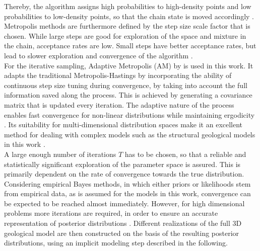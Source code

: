         Thereby, the algorithm assigns high probabilities to high-density points and low probabilities to low-density points, so that the chain state is moved accordingly \citep{delaVarga2016}.\\
        Metropolis methods are furthermore defined by the step size scale factor that is chosen. While large steps are good for exploration of the space and mixture in the chain, acceptance rates are low. Small steps have better acceptance rates, but lead to slower exploration and convergence of the algorithm \citep{delaVarga2016}.\\
        For the iterative sampling, Adaptive Metropolis (AM) by \citet{haario2001adaptive} is used in this work. It adapts the traditional Metropolis-Hastings by incorporating the ability of continuous step size tuning during convergence, by taking into account the full information saved along the process. This is achieved by generating a covariance matrix that is updated every iteration. The adaptive nature of the process enables fast convergence for non-linear distributions while maintaining ergodicity \citet{haario2001adaptive, delaVarga2016}. Its suitability for multi-dimensional distribution spaces make it an excellent method for dealing with complex models such as the structural geological models in this work \citep{schaaf2017}.\\
        A large enough number of iterations $T$ has to be chosen, so that a reliable and statistically significant exploration of the parameter space is assured. This is primarily dependent on the rate of convergence towards the true distribution. Considering empirical Bayes methods, in which either priors or likelihoods stem from empirical data, as is assumed for the models in this work, convergence can be expected to be reached almost immediately. However, for high dimensional problems more iterations are required, in order to ensure an accurate representation of posterior distributions \citep{wellmann2017sandstone}. Different realizations of the full 3D geological model are then constructed on the basis of the resulting posterior distributions, using an implicit modeling step described in the following.
        
